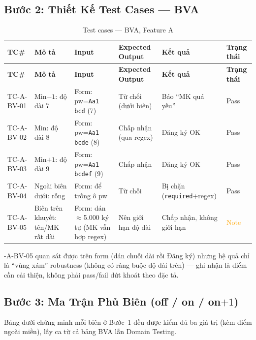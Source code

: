 \documentclass[12pt, a4paper]{report}
\begin{document}
\subsection{Bước 2: Thiết Kế Test Cases — BVA}
\begin{longtable}{C{1cm} L{3cm} L{3.5cm} L{3cm} C{2cm} C{1.5cm}}
    \caption{Test cases — BVA, Feature A} \\
    \toprule
    \textbf{TC\#} & \textbf{Mô tả} & \textbf{Input} & \textbf{Expected Output} & \textbf{Kết quả} & \textbf{Trạng thái} \\
    \midrule
    \endfirsthead
    \toprule
    \textbf{TC\#} & \textbf{Mô tả} & \textbf{Input} & \textbf{Expected Output} & \textbf{Kết quả} & \textbf{Trạng thái} \\
    \midrule
    \endhead
    \bottomrule
    \endlastfoot
    TC-A-BV-01 & Min$-1$: độ dài 7 & Form: pw=\texttt{Aa1 bcd} (7) & Từ chối (dưới biên) & Báo ``MK quá yếu'' & \textcolor{green!60!black}{Pass} \\
    TC-A-BV-02 & Min: độ dài 8 & Form: pw=\texttt{Aa1 bcde} (8) & Chấp nhận (qua regex) & Đăng ký OK & \textcolor{green!60!black}{Pass} \\
    TC-A-BV-03 & Min$+1$: độ dài 9 & Form: pw=\texttt{Aa1 bcdef} (9) & Chấp nhận & Đăng ký OK & \textcolor{green!60!black}{Pass} \\
    TC-A-BV-04 & Ngoài biên dưới: rỗng & Form: để trống ô pw & Từ chối & Bị chặn (\texttt{required}+regex) & \textcolor{green!60!black}{Pass} \\
    TC-A-BV-05 & Biên trên khuyết: tên/MK rất dài & Form: dán $\approx$5.000 ký tự (MK vẫn hợp regex) & Nên giới hạn độ dài & Chấp nhận, không giới hạn & \textcolor{orange}{Note} \\
\end{longtable}
\noindentTC-A-BV-05 quan sát được trên form (dán chuỗi dài rồi Đăng ký) nhưng hệ quả chỉ
là ``vùng xám'' robustness (không có ràng buộc độ dài trên) --- ghi nhận là điểm cần cải thiện,
không phải pass/fail dứt khoát theo đặc tả.

\subsection{Bước 3: Ma Trận Phủ Biên (off / on / on$+1$)}
Bảng dưới chứng minh mỗi biên ở Bước~1 đều được kiểm đủ ba giá trị (kèm điểm ngoài miền), lấy ca
từ cả bảng BVA lẫn Domain Testing.
\end{document}

